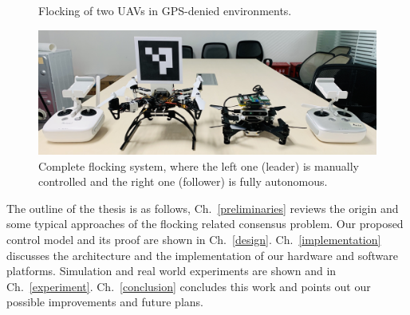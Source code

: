\begin{figure}[htb]
  \centering
  \caption{Flocking of two UAVs in GPS-denied environments.}\label{fig:indoor_outdoor}
\end{figure}

\begin{figure}[H]
  \centering
  \includegraphics[width=1\textwidth]{figure/chapter_1/all.jpg}
  \caption{Complete flocking system, where the left one (leader) is manually controlled and the right one (follower) is fully autonomous.}
  \label{fig:twin}
\end{figure}

The outline of the thesis is as follows, Ch.~\ref{preliminaries} reviews the origin and some typical approaches of the flocking related consensus problem. Our proposed control model and its proof are shown in Ch.~\ref{design}. Ch.~\ref{implementation} discusses the architecture and the implementation of our hardware and software platforms. Simulation and real world experiments are shown and in Ch.~\ref{experiment}. Ch.~\ref{conclusion} concludes this work and points out our possible improvements and future plans.

\newpage
